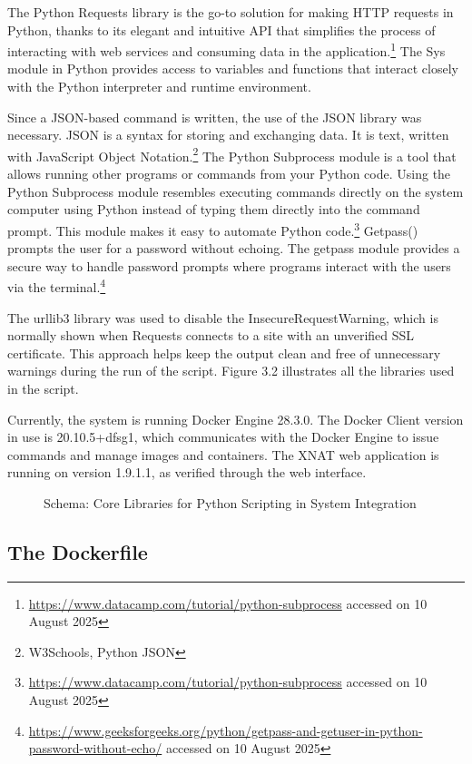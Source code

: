 The Python Requests library is the go-to solution for making \ac{HTTP} requests in Python, thanks to its elegant and intuitive API that simplifies the process of interacting with web services and consuming data in the application.\footnote{\url{https://www.datacamp.com/tutorial/python-subprocess} accessed on 10 August 2025} The Sys module in Python provides access to variables and functions that interact closely with the Python interpreter and runtime environment.

Since a JSON-based command is written, the use of the JSON library was necessary. JSON is a syntax for storing and exchanging data. It is text, written with JavaScript Object Notation.\footnote{W3Schools, Python JSON}
The Python Subprocess module is a tool that allows running other programs or commands from your Python code. Using the Python Subprocess module resembles executing commands directly on the system computer using Python instead of typing them directly into the command prompt. This module makes it easy to automate Python code.\footnote{\url{https://www.datacamp.com/tutorial/python-subprocess} accessed on 10 August 2025}
Getpass() prompts the user for a password without echoing. The getpass module provides a secure way to handle password prompts where programs interact with the users via the terminal.\footnote{\url{https://www.geeksforgeeks.org/python/getpass-and-getuser-in-python-password-without-echo/} accessed on 10 August 2025}

The urllib3 library was used to disable the InsecureRequestWarning, which is normally shown when Requests connects to a site with an unverified SSL certificate. This approach helps keep the output clean and free of unnecessary warnings during the run of the script. Figure 3.2 illustrates all the libraries used in the script.

Currently, the system is running Docker Engine 28.3.0. The Docker Client version in use is 20.10.5+dfsg1, which communicates with the Docker Engine to issue commands and manage images and containers. The XNAT web application is running on version 1.9.1.1, as verified through the web interface.


\begin{figure}[ht]
  \centering
  \def\svgwidth{0.8\linewidth}
  
  \caption{Schema: Core Libraries for Python Scripting in System Integration}
  \label{fig:diagram-core-libraries}
\end{figure}
 
  \subsection{The Dockerfile}
 
